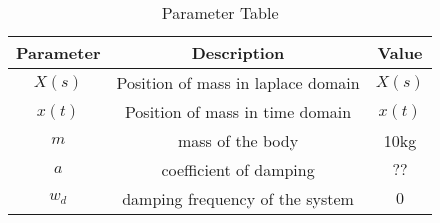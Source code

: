 \begin{table}[H]
    \center
    \renewcommand\thetable{1}
 

\def\arraystretch{3}
    \begin{tabular}{|c|c|c|}
    \hline
        \textbf{Parameter}&\textbf{Description}&\textbf{Value}\\
        \hline
        $X(s)$&Position of mass in laplace domain&$X(s)$\\
        \hline
        $x(t)$&Position of mass in time domain&$x(t)$ \\
        \hline
        $m$ &mass of the body&10kg \\
        \hline
        $a$&coefficient of damping &$??$ \\
        \hline
        $w_d$&damping frequency of the system&$0$ \\
        \hline
       \end{tabular}
    \caption{Parameter Table}

    \label{tab:2021ae19}
\end{table}

